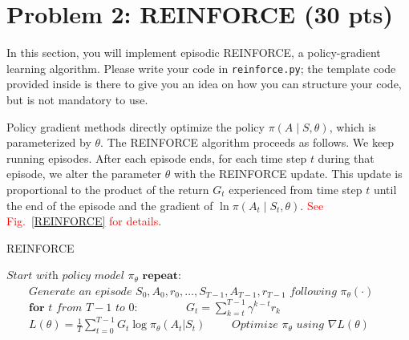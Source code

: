 \documentclass[12pt]{article}
\begin{document}
\newpage
\section*{Problem 2: REINFORCE (30 pts)}

In this section, you will implement episodic REINFORCE, a policy-gradient learning algorithm. Please write your code in \texttt{reinforce.py}; the template code provided inside is there to give you an idea on how you can structure your code, but is not mandatory to use.

Policy gradient methods directly optimize the policy $\pi(A \mid S, \theta)$, which is parameterized by $\theta$. The REINFORCE algorithm proceeds as follows. We keep running episodes. After each episode ends, for each time step $t$ during that episode, we alter the parameter $\theta$ with the REINFORCE update. This update is proportional to the product of the return $G_t$ experienced from time step $t$ until the end of the episode and the gradient of $\ln \pi(A_t \mid S_t, \theta)$. \textcolor{red}{See Fig.~\ref{REINFORCE} for details}.


\begin{algorithm}
\caption{REINFORCE\label{REINFORCE}}
\begin{algorithmic}[1]
\State $\textit{Start with policy model } \pi_\theta $
\State $\textbf{repeat:}$
\State $\qquad\textit{Generate an episode } S_0, A_0, r_0, \ldots, S_{T-1}, A_{T-1}, r_{T-1} \textit{ following } \pi_\theta(\cdot)$
\State $\qquad\textbf{for } t \textit{ from } T-1 \textit{ to } 0$:
\State $\qquad\qquad G_t = \sum_{k=t}^{T-1} \gamma^{k-t} r_{k}$ 
\State $\qquad L(\theta) = \frac{1}{T} \sum_{t=0}^{T-1} G_t \log \pi_\theta(A_t | S_t)$
\State $\qquad\textit{Optimize } \pi_\theta \textit{ using } \nabla L(\theta)$
\EndProcedure
\end{algorithmic}
\end{algorithm}
\end{document}

